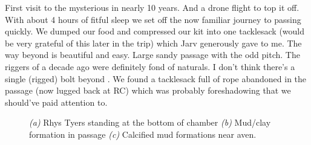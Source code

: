 First visit to the mysterious  in nearly 10 years. And a drone flight to top it off. With about 4 hours of fitful sleep we set off the now familiar journey to  passing quickly. We dumped our food and compressed our kit into one tacklesack (would be very grateful of this later in the trip) which Jarv generously gave to me.
The way beyond  is beautiful and easy. Large sandy passage with the odd pitch. The riggers of a decade ago were definitely fond of naturals. I don't think there's a single (rigged) bolt beyond . We found a tacklesack full of rope abandoned in the passage (now lugged back at RC) which was probably foreshadowing that we should've paid attention to. 

        
 
          


\begin{figure}[t]
\checkoddpage \ifoddpage \forcerectofloat \else \forceversofloat \fi
    \centering
          
    \begin{subfigure}[t]{\textwidth}
   		 \centering
		\caption{} \label{republika}
 		 \vspace{0cm}
      \end{subfigure}
              
     \begin{subfigure}[t]{0.355\textwidth}
       		 \centering
       		 \caption{} \label{Will Scott bolting}
      \end{subfigure}
      \hfill
      \begin{subfigure}[t]{0.629\textwidth}
       	 	\centering
        		\caption{} \label{mud formations}
    	\end{subfigure}

    \caption{
        	\emph{(a)}  Rhys Tyers standing at the bottom of \protect{} chamber
    	 \emph{(b)} Mud/clay formation in \protect{} passage 
  	 \emph{(c)} Calcified mud formations near  aven. }
\end{figure}


